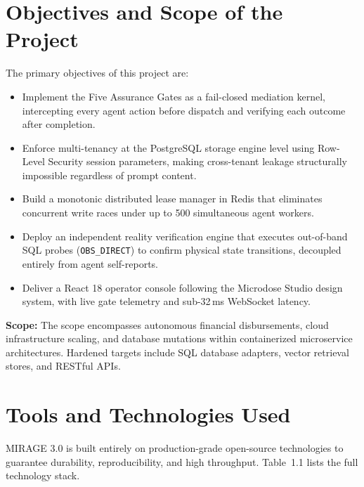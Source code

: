 \documentclass[12pt,a4paper]{report}
\numberwithin{equation}{section}
\begin{document}
\section{Objectives and Scope of the Project}
The primary objectives of this project are:
\begin{itemize}
    \item Implement the Five Assurance Gates as a fail-closed mediation kernel, intercepting every agent action before dispatch and verifying each outcome after completion.
    \item Enforce multi-tenancy at the PostgreSQL storage engine level using Row-Level Security session parameters, making cross-tenant leakage structurally impossible regardless of prompt content.
    \item Build a monotonic distributed lease manager in Redis that eliminates concurrent write races under up to 500 simultaneous agent workers.
    \item Deploy an independent reality verification engine that executes out-of-band SQL probes (\texttt{OBS\_DIRECT}) to confirm physical state transitions, decoupled entirely from agent self-reports.
    \item Deliver a React 18 operator console following the Microdose Studio design system, with live gate telemetry and sub-32\,ms WebSocket latency.
\end{itemize}

\textbf{Scope:} The scope encompasses autonomous financial disbursements, cloud infrastructure scaling, and database mutations within containerized microservice architectures. Hardened targets include SQL database adapters, vector retrieval stores, and RESTful APIs.

\section{Tools and Technologies Used}
MIRAGE 3.0 is built entirely on production-grade open-source technologies to guarantee durability, reproducibility, and high throughput. Table~1.1 lists the full technology stack.
\end{document}
